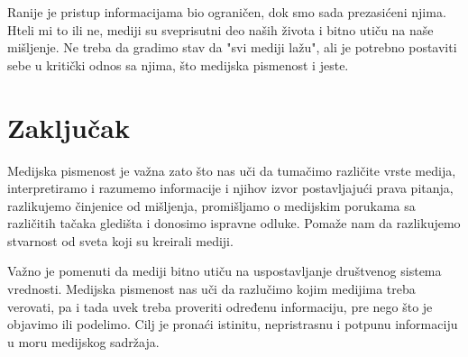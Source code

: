 \documentclass[a4paper]{article}
\begin{document}
Ranije je pristup informacijama bio ograničen, dok smo sada prezasićeni njima. Hteli mi to ili ne, mediji su sveprisutni deo naših života i bitno utiču na naše mišljenje. Ne treba da gradimo stav da "svi mediji lažu", ali je potrebno postaviti sebe u kritički odnos sa njima, što medijska pismenost i jeste.

\newpage
\section{Zaključak}
\label{sec:zakljucak}

Medijska pismenost je važna zato što nas uči da tumačimo različite vrste medija, interpretiramo i razumemo informacije i njihov izvor postavljajući prava pitanja, razlikujemo činjenice od mišljenja, promišljamo o medijskim porukama sa različitih tačaka gledišta i donosimo ispravne odluke. Pomaže nam da razlikujemo stvarnost od sveta koji su kreirali mediji. 


Važno je pomenuti da mediji bitno utiču na uspostavljanje društvenog sistema vrednosti. Medijska pismenost nas uči da razlučimo kojim medijima treba verovati, pa i tada uvek treba proveriti određenu informaciju, pre nego što je objavimo ili podelimo. Cilj je pronaći istinitu, nepristrasnu i potpunu informaciju u moru medijskog sadržaja.

\appendix

\end{document}
